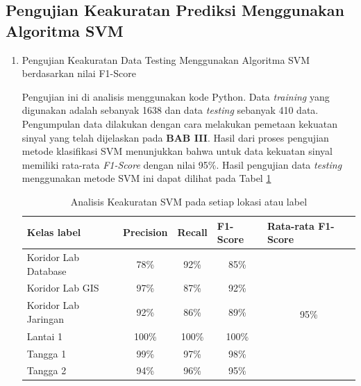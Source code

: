 \subsection{Pengujian Keakuratan Prediksi Menggunakan Algoritma SVM}
\begin{enumerate}

	\item Pengujian Keakuratan Data Testing Menggunakan Algoritma SVM berdasarkan nilai F1-Score

	      \par Pengujian ini di analisis menggunakan kode Python. Data \textit{training} yang digunakan adalah sebanyak 1638 dan data \textit{testing} sebanyak 410 data. Pengumpulan data dilakukan dengan cara melakukan pemetaan kekuatan sinyal yang telah dijelaskan pada \textbf{BAB III}. Hasil dari proses pengujian metode klasifikasi SVM menunjukkan bahwa untuk data kekuatan sinyal memiliki rata-rata \textit{F1-Score} dengan nilai 95\%. Hasil pengujian data \textit{testing} menggunakan metode SVM ini dapat dilihat pada Tabel \ref{tabelpercobaansvm1}

	      \begin{table}[H]
		      \center
		      \caption{Analisis Keakuratan SVM pada setiap lokasi atau label}
		      \label{tabelpercobaansvm1}
		      \begin{tabular}{|l|c|c|c|c|}
			      \hline
			      Kelas label          & \multicolumn{1}{l|}{Precision} & \multicolumn{1}{l|}{Recall} & \multicolumn{1}{l|}{F1-Score} & \multicolumn{1}{l|}{Rata-rata F1-Score} \\ \hline
			      Koridor Lab Database & 78\%                           & 92\%                        & 85\%                          & \multirow{6}{*}{95\%}                   \\ \cline{1-4}
			      Koridor Lab GIS      & 97\%                           & 87\%                        & 92\%                          &                                         \\ \cline{1-4}
			      Koridor Lab Jaringan & 92\%                           & 86\%                        & 89\%                          &                                         \\ \cline{1-4}
			      Lantai 1             & 100\%                          & 100\%                       & 100\%                         &                                         \\ \cline{1-4}
			      Tangga 1             & 99\%                           & 97\%                        & 98\%                          &                                         \\ \cline{1-4}
			      Tangga 2             & 94\%                           & 96\%                        & 95\%                          &                                         \\ \hline
		      \end{tabular}
	      \end{table}


\end{enumerate}

